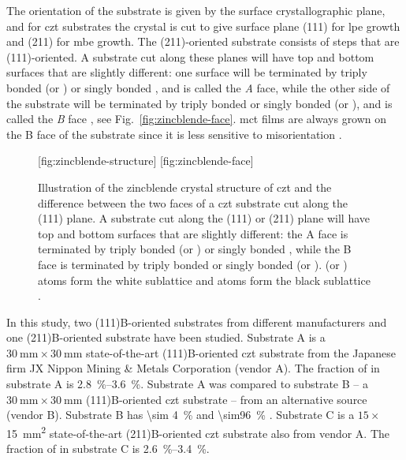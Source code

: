 The orientation of the substrate is given by the surface crystallographic plane, and for \ac{czt} substrates the crystal is cut to give surface plane (111) for \ac{lpe} growth and (211) for \ac{mbe} growth. The (211)-oriented substrate consists of steps that are (111)-oriented. A substrate cut along these planes will have top and bottom surfaces that are slightly different: one surface will be terminated by triply bonded  (or ) or singly bonded , and is called the \emph{A} face, while the other side of the substrate will be terminated by triply bonded  or singly bonded  (or ), and is called the \emph{B} face \citep{sivananthan1986relation}, see Fig.~\ref{fig:zincblende-face}. \Ac{mct} films are always grown on the B face of the substrate since it is less sensitive to misorientation \citep{parker1988terracing, edwall1984liquid}.

\begin{figure}[htbp]
    \centering
    [fig:zincblende-structure]
    \hfill
    [fig:zincblende-face]
    \caption[Crystal structure of \ac{czt}.]{Illustration of  the zincblende crystal structure of \ac{czt} and  the difference between the two faces of a \ac{czt} substrate cut along the (111) plane. A substrate cut along the (111) or (211) plane will have top and bottom surfaces that are slightly different: the A face is terminated by triply bonded  (or ) or singly bonded , while the B face is terminated by triply bonded  or singly bonded  (or ).  (or ) atoms form the white sublattice and  atoms form the black sublattice \citep[Adapted from][]{sivananthan1986relation}.}
    \label{fig:zincblende}
\end{figure}

In this study, two (111)B-oriented substrates from different manufacturers and one (211)B-oriented substrate have been studied. Substrate A is a $\SI{30}{\milli\metre}\times\SI{30}{\milli\metre}$ state-of-the-art (111)B-oriented \ac{czt} substrate from the Japanese firm JX Nippon Mining \& Metals Corporation (vendor A). The fraction of  in substrate A is \SIrange{2.8}{3.6}{\percent}. Substrate A was compared to substrate B -- a $\SI{30}{\milli\metre}\times\SI{30}{\milli\metre}$ (111)B-oriented \ac{czt} substrate -- from an alternative source (vendor B). Substrate B has \SI{\sim 4}{\percent}  and \SI{\sim96}{\percent} . Substrate C is a $15\times$\SI{15}{\milli\metre^2} state-of-the-art (211)B-oriented \ac{czt} substrate also from vendor A. The fraction of  in substrate C is \SIrange{2.6}{3.4}{\percent}. %


